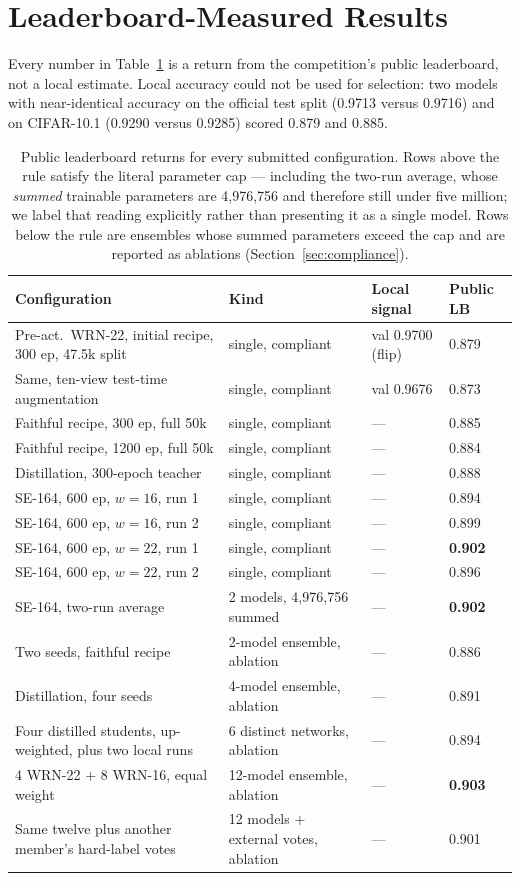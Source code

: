 \documentclass[letterpaper]{article} %
\begin{document}
\section{Leaderboard-Measured Results}
\label{sec:results}

Every number in Table~\ref{tab:lb} is a return from the competition's public leaderboard, not
a local estimate. Local accuracy could not be used for selection: two models with
near-identical accuracy on the official test split (0.9713 versus 0.9716) and on CIFAR-10.1
(0.9290 versus 0.9285) scored 0.879 and 0.885.

\begin{table}[t]
\centering
\small
\begin{tabular}{llll}
\toprule
Configuration & Kind & Local signal & Public LB \\
\midrule
Pre-act.\ WRN-22, initial recipe, 300 ep, 47.5k split & single, compliant & val 0.9700 (flip) & 0.879 \\
Same, ten-view test-time augmentation & single, compliant & val 0.9676 & 0.873 \\
Faithful recipe, 300 ep, full 50k & single, compliant & --- & 0.885 \\
Faithful recipe, 1200 ep, full 50k & single, compliant & --- & 0.884 \\
Distillation, 300-epoch teacher & single, compliant & --- & 0.888 \\
SE-164, 600 ep, $w{=}16$, run 1 & single, compliant & --- & 0.894 \\
SE-164, 600 ep, $w{=}16$, run 2 & single, compliant & --- & 0.899 \\
SE-164, 600 ep, $w{=}22$, run 1 & single, compliant & --- & \textbf{0.902} \\
SE-164, 600 ep, $w{=}22$, run 2 & single, compliant & --- & 0.896 \\
SE-164, two-run average & 2 models, 4{,}976{,}756 summed & --- & \textbf{0.902} \\
\midrule
Two seeds, faithful recipe & 2-model ensemble, ablation & --- & 0.886 \\
Distillation, four seeds & 4-model ensemble, ablation & --- & 0.891 \\
Four distilled students, up-weighted, plus two local runs & 6 distinct networks, ablation & --- & 0.894 \\
4 WRN-22 + 8 WRN-16, equal weight & 12-model ensemble, ablation & --- & \textbf{0.903} \\
Same twelve plus another member's hard-label votes & 12 models + external votes, ablation & --- & 0.901 \\
\bottomrule
\end{tabular}
\caption{Public leaderboard returns for every submitted configuration. Rows above the rule
satisfy the literal parameter cap --- including the two-run average, whose \emph{summed}
trainable parameters are 4{,}976{,}756 and therefore still under five million; we label that
reading explicitly rather than presenting it as a single model. Rows below the rule are
ensembles whose summed parameters exceed the cap and are reported as ablations
(Section~\ref{sec:compliance}).}
\label{tab:lb}
\end{table}
\end{document}
